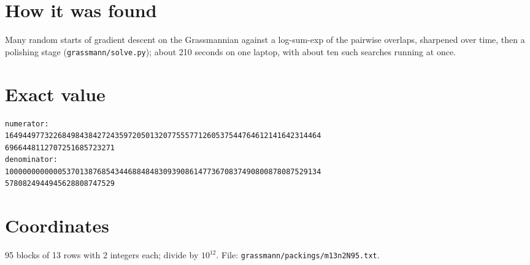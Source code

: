 \documentclass[11pt,a4paper]{article}
\begin{document}
\section{How it was found}
Many random starts of gradient descent on the Grassmannian against a log-sum-exp of the pairwise overlaps, sharpened over time, then a polishing stage (\texttt{grassmann/solve.py}); about 210 seconds on one laptop, with about ten such searches running at once.


\appendix
\section{Exact value}
{\small
\begin{verbatim}
numerator:
164944977322684984384272435972050132077555771260537544764612141642314464
6966448112707251685723271
denominator:
100000000000053701387685434468848483093908614773670837490800878087529134
5780824944945628808747529
\end{verbatim}}

\section{Coordinates}
95 blocks of 13 rows with 2 integers each; divide by $10^{12}$. File: \texttt{grassmann/packings/m13n2N95.txt}.
{\tiny
\begin{multicols}{4}
\end{multicols}}
\end{document}
